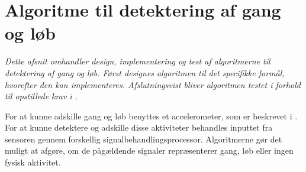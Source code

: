 \section{Algoritme til detektering af gang og løb}\label{sec:algogangloeb}
\textit{Dette afsnit omhandler design, implementering og test af algoritmerne til detektering af gang og løb. Først designes algoritmen til det specifikke formål, hvorefter den kan implementeres. Afslutningsvist bliver algoritmen testet i forhold til opstillede krav i .} 

For at kunne adskille gang og løb benyttes et accelerometer, som er beskrevet i . For at kunne detektere og adskille disse aktiviteter behandles inputtet fra sensoren gennem forskellig signalbehandlingsprocessor. Algoritmerne gør det muligt at afgøre, om de pågældende signaler repræsenterer gang, løb eller ingen fysisk aktivitet. 


